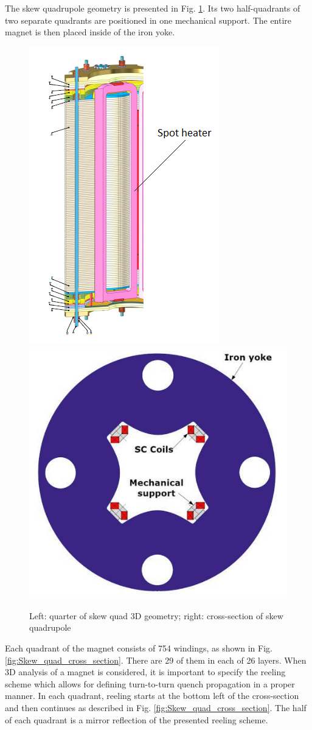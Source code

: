 
The skew quadrupole geometry is presented in Fig. \ref{fig:Skew_quad_geometry}. Its two half-quadrants of two separate quadrants are positioned in one mechanical support. The entire magnet is then placed inside of the iron yoke. 
\begin{figure}[h!]
    \centering
    \includegraphics[width=0.25\linewidth]{figures/corrector_geometries/SpotHeaterPosition.png}
    \includegraphics[width=0.30\linewidth]{figures/corrector_geometries/Quadrupole_Cross_Section.png}
    \caption{Left: quarter of skew quad 3D geometry; right: cross-section of skew quadrupole \cite{hl_lhc_tech_design_report_v01}}
    \label{fig:Skew_quad_geometry}
\end{figure}
Each quadrant of the magnet consists of 754 windings, as shown in Fig. \ref{fig:Skew_quad_cross_section}. There are 29 of them in each of 26 layers. When 3D analysis of a magnet is considered, it is important to specify the reeling scheme which allows for defining turn-to-turn quench propagation in a proper manner. In each quadrant, reeling starts at the bottom left of the cross-section and then continues as described in Fig. \ref{fig:Skew_quad_cross_section}. The  half of each quadrant is a mirror reflection of the presented reeling scheme.

